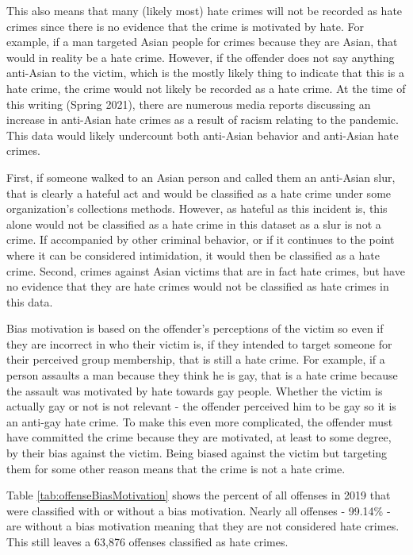 \documentclass[
]{krantz}
\begin{document}
This also means that many (likely most) hate crimes will not
be recorded as hate crimes since there is no evidence that
the crime is motivated by hate. For example, if a man
targeted Asian people for crimes because they are Asian,
that would in reality be a hate crime. However, if the
offender does not say anything anti-Asian to the victim,
which is the mostly likely thing to indicate that this is a
hate crime, the crime would not likely be recorded as a hate
crime. At the time of this writing (Spring 2021), there are
numerous media reports discussing an increase in anti-Asian
hate crimes as a result of racism relating to the pandemic.
This data would likely undercount both anti-Asian behavior
and anti-Asian hate crimes.

First, if someone walked to an Asian person and called them
an anti-Asian slur, that is clearly a hateful act and would
be classified as a hate crime under some organization's
collections methods. However, as hateful as this incident
is, this alone would not be classified as a hate crime in
this dataset as a slur is not a crime. If accompanied by
other criminal behavior, or if it continues to the point
where it can be considered intimidation, it would then be
classified as a hate crime. Second, crimes against Asian
victims that are in fact hate crimes, but have no evidence
that they are hate crimes would not be classified as hate
crimes in this data.

Bias motivation is based on the offender's perceptions of
the victim so even if they are incorrect in who their victim
is, if they intended to target someone for their perceived
group membership, that is still a hate crime. For example,
if a person assaults a man because they think he is gay,
that is a hate crime because the assault was motivated by
hate towards gay people. Whether the victim is actually gay
or not is not relevant - the offender perceived him to be
gay so it is an anti-gay hate crime. To make this even more
complicated, the offender must have committed the crime
because they are motivated, at least to some degree, by
their bias against the victim. Being biased against the
victim but targeting them for some other reason means that
the crime is not a hate crime.

Table \ref{tab:offenseBiasMotivation} shows the percent of
all offenses in 2019 that were classified with or without a
bias motivation. Nearly all offenses - 99.14\% - are without
a bias motivation meaning that they are not considered hate
crimes. This still leaves a 63,876 offenses classified as
hate crimes.
\end{document}
